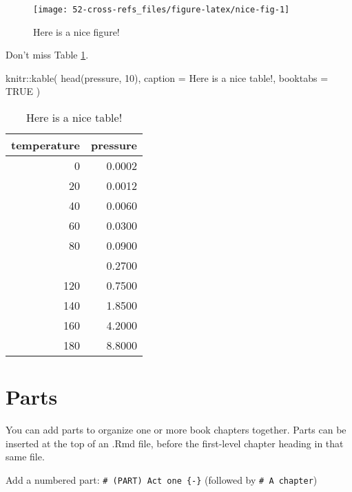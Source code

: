 \documentclass[
]{book}
\newenvironment{Shaded}{\begin{snugshade}}{\end{snugshade}}
\newcommand{\AttributeTok}[1]{\textcolor[rgb]{0.77,0.63,0.00}{#1}}
\newcommand{\ConstantTok}[1]{\textcolor[rgb]{0.00,0.00,0.00}{#1}}
\newcommand{\DecValTok}[1]{\textcolor[rgb]{0.00,0.00,0.81}{#1}}
\newcommand{\FunctionTok}[1]{\textcolor[rgb]{0.00,0.00,0.00}{#1}}
\newcommand{\NormalTok}[1]{#1}
\newcommand{\SpecialCharTok}[1]{\textcolor[rgb]{0.00,0.00,0.00}{#1}}
\newcommand{\StringTok}[1]{\textcolor[rgb]{0.31,0.60,0.02}{#1}}
\theoremstyle{definition}
\theoremstyle{definition}
\theoremstyle{definition}
\theoremstyle{definition}
\theoremstyle{remark}
\begin{document}
\begin{figure}

{\centering \texttt{[image: 52-cross-refs\_files/figure-latex/nice-fig-1]} 

}

\caption{Here is a nice figure!}\label{fig:nice-fig}
\end{figure}

Don't miss Table \ref{tab:nice-tab}.

\begin{Shaded}
\begin{Highlighting}[]
\NormalTok{knitr}\SpecialCharTok{::}\FunctionTok{kable}\NormalTok{(}
  \FunctionTok{head}\NormalTok{(pressure, }\DecValTok{10}\NormalTok{), }\AttributeTok{caption =} \StringTok{\textquotesingle{}Here is a nice table!\textquotesingle{}}\NormalTok{,}
  \AttributeTok{booktabs =} \ConstantTok{TRUE}
\NormalTok{)}
\end{Highlighting}
\end{Shaded}

\begin{table}

\caption{\label{tab:nice-tab}Here is a nice table!}
\centering
\begin{tabular}[t]{rr}
\toprule
temperature & pressure\\
\midrule
0 & 0.0002\\
20 & 0.0012\\
40 & 0.0060\\
60 & 0.0300\\
80 & 0.0900\\
\addlinespace
100 & 0.2700\\
120 & 0.7500\\
140 & 1.8500\\
160 & 4.2000\\
180 & 8.8000\\
\bottomrule
\end{tabular}
\end{table}

\hypertarget{parts}{%
\chapter{Parts}\label{parts}}

You can add parts to organize one or more book chapters together. Parts can be inserted at the top of an .Rmd file, before the first-level chapter heading in that same file.

Add a numbered part: \texttt{\#\ (PART)\ Act\ one\ \{-\}} (followed by \texttt{\#\ A\ chapter})
\end{document}
